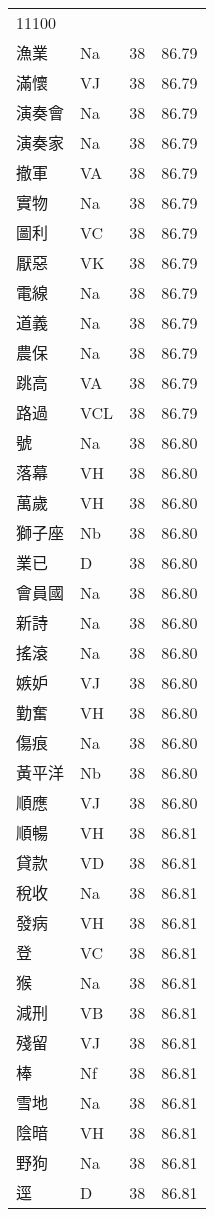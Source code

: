 \documentclass[twocolumn]{book}
\begin{document}
\begin{supertabular}{llrr}
11100\\
漁業 & Na & 38 &  86.79\\
滿懷 & VJ & 38 &  86.79\\
演奏會 & Na & 38 &  86.79\\
演奏家 & Na & 38 &  86.79\\
撤軍 & VA & 38 &  86.79\\
實物 & Na & 38 &  86.79\\
圖利 & VC & 38 &  86.79\\
厭惡 & VK & 38 &  86.79\\
電線 & Na & 38 &  86.79\\
道義 & Na & 38 &  86.79\\
農保 & Na & 38 &  86.79\\
跳高 & VA & 38 &  86.79\\
路過 & VCL & 38 &  86.79\\
號 & Na & 38 &  86.80\\
落幕 & VH & 38 &  86.80\\
萬歲 & VH & 38 &  86.80\\
獅子座 & Nb & 38 &  86.80\\
業已 & D & 38 &  86.80\\
會員國 & Na & 38 &  86.80\\
新詩 & Na & 38 &  86.80\\
搖滾 & Na & 38 &  86.80\\
嫉妒 & VJ & 38 &  86.80\\
勤奮 & VH & 38 &  86.80\\
傷痕 & Na & 38 &  86.80\\
黃平洋 & Nb & 38 &  86.80\\
順應 & VJ & 38 &  86.80\\
順暢 & VH & 38 &  86.81\\
貸款 & VD & 38 &  86.81\\
稅收 & Na & 38 &  86.81\\
發病 & VH & 38 &  86.81\\
登 & VC & 38 &  86.81\\
猴 & Na & 38 &  86.81\\
減刑 & VB & 38 &  86.81\\
殘留 & VJ & 38 &  86.81\\
棒 & Nf & 38 &  86.81\\
雪地 & Na & 38 &  86.81\\
陰暗 & VH & 38 &  86.81\\
野狗 & Na & 38 &  86.81\\
逕 & D & 38 &  86.81\\

\end{supertabular}
\end{document}
